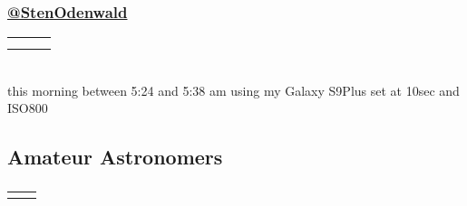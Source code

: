 \begin{frame}\frametitle{ \href{https://anecdata.org/user/StenOdenwald/}{ @StenOdenwald}}
\begin{table}[htp]
\begin{center}
\begin{tabular}{ccc}
	\href{\urlAnec 105719}{
	\begin{overpic}[ scale = 0.25]
		{\pLocalGraphics photos/anecdata/anec-105719a}
	\end{overpic}} &
	\href{\urlAnec105719}{
	\begin{overpic}[ scale = 0.25]
		{\pLocalGraphics photos/anecdata/anec-105719b}
	\end{overpic}} &
	\href{\urlAnec105719}{
	\begin{overpic}[ scale = 0.25]
		{\pLocalGraphics photos/anecdata/anec-105719c}
	\end{overpic}} \\[15pt]
	\href{\urlAnec105719}{
	\begin{overpic}[ scale = 0.25]
		{\pLocalGraphics photos/anecdata/anec-105719d}
	\end{overpic}} &
	\href{\urlAnec105719}{
	\begin{overpic}[ scale = 0.25]
		{\pLocalGraphics photos/anecdata/anec-105719e}
	\end{overpic}} &
	\href{\urlAnec105719}{
	\begin{overpic}[ scale = 0.25]
		{\pLocalGraphics photos/anecdata/anec-105719f}
	\end{overpic}}
\end{tabular}
\\
\small{{\color{blue}{StarLink satellites}} this morning between 5:24 and 5:38 am using my Galaxy S9Plus set at 10sec and ISO800}
\end{center}
\label{tab:anec-02}
\end{table}%
\end{frame}



\subsection{Amateur Astronomers}
\begin{frame}\frametitle{}
\begin{table}[htp]
\begin{center}
\begin{tabular}{cc}
	\Gunagulla{
	\begin{overpic}[ scale = 0.216]
		{\pLocalGraphics photos/C2011W3201112293X30s}
	\end{overpic}} &
	\Gunagulla{
	\begin{overpic}[ scale = 0.9]
		{\pLocalGraphics photos/C2011W3-85mm-20111225}
	\end{overpic}}
\end{tabular}
\end{center}
\label{tab:Garradd}
\end{table}%
\end{frame}


